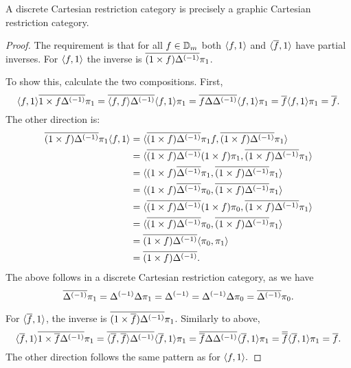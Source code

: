 \begin{lemma}\label{lem:a_discrete_crc_is_precisely_a_graphic_crc}
  A discrete Cartesian restriction category \D is precisely a graphic Cartesian restriction category.
\end{lemma}
\begin{proof}
  The requirement is that for all $f\in {\ensuremath{\mathbb{D}}}_m$ both $\langle f,1\rangle$ and $\langle\overline{f},1\rangle$ have partial
  inverses. For $\langle f,1\rangle$ the inverse is $\overline{(1 \times f){\Delta}^{(-1)}} \pi_1$.

  To show this, calculate  the two compositions. First,
  \[
    \<f,1\> \rst{1 \times f \inv{\Delta}} \pi_1 =
      \rst{\<f,f\> \inv{\Delta}}\<f,1\>\pi_1 %
    = \rst{f \Delta \inv{\Delta}}\<f,1\>\pi_1 %
    = \rst{f}\<f,1\>\pi_1 %
    = \rst{f}.%
  \]
  The other direction is:
  \begin{align*}
    \rst{(1 \times f)\inv{\Delta}} \pi_1 \<f,1\>
      &= \< \rst{(1 \times f)\inv{\Delta}} \pi_1 f ,
      \rst{(1 \times f)\inv{\Delta}}\pi_1 \>\\ %
    &= \< \rst{(1 \times f)\inv{\Delta}} (1 \times f) \pi_1,
      \rst{(1 \times f)\inv{\Delta}}\pi_1 \>\\ %
    &= \< (1 \times f )\rst{\inv{\Delta}} \pi_1 ,
      \rst{(1 \times f)\inv{\Delta}}\pi_1 \>\\ %
    &= \< (1 \times f) \rst{\inv{\Delta}} \pi_0 ,
      \rst{(1 \times f)\inv{\Delta}}\pi_1 \>\\ %
    &= \< \rst{(1 \times f)\inv{\Delta}} (1 \times f) \pi_0,
      \rst{(1 \times f)\inv{\Delta}}\pi_1 \>\\ %
    &= \< \rst{(1 \times f)\inv{\Delta}} \pi_0,
      \rst{(1 \times f)\inv{\Delta}}\pi_1 \>\\ %
    &= \rst{(1 \times f)\inv{\Delta}} \< \pi_0, \pi_1 \>\\ %
    &= \rst{(1 \times f)\inv{\Delta}}.
  \end{align*}
  The above follows in a discrete Cartesian restriction category, as we have
  \begin{equation*}
    \overline{{\Delta}^{(-1)}} \pi_1 = {\Delta}^{(-1)} \Delta \pi_1 = {\Delta}^{(-1)} = {\Delta}^{(-1)} \Delta \pi_0 = \overline{{\Delta}^{(-1)}} \pi_0.
  \end{equation*}

  For $\langle\overline{f},1\rangle$, the inverse is $\overline{(1 \times \overline{f}){\Delta}^{(-1)}} \pi_1$. Similarly
  to above,
  \[
    \<\rst{f},1\> \rst{1 \times \rst{f} \inv{\Delta}} \pi_1 =
      \rst{\<\rst{f},\rst{f}\> \inv{\Delta}}\<\rst{f},1\>\pi_1 %
    = \rst{\rst{f} \Delta \inv{\Delta}}\<\rst{f},1\>\pi_1 %
    = \rst{\rst{f}}\<\rst{f},1\>\pi_1 %
    = \rst{f}.%
  \]
  The other direction follows the same pattern as for $\langle f,1\rangle.$
\end{proof}

